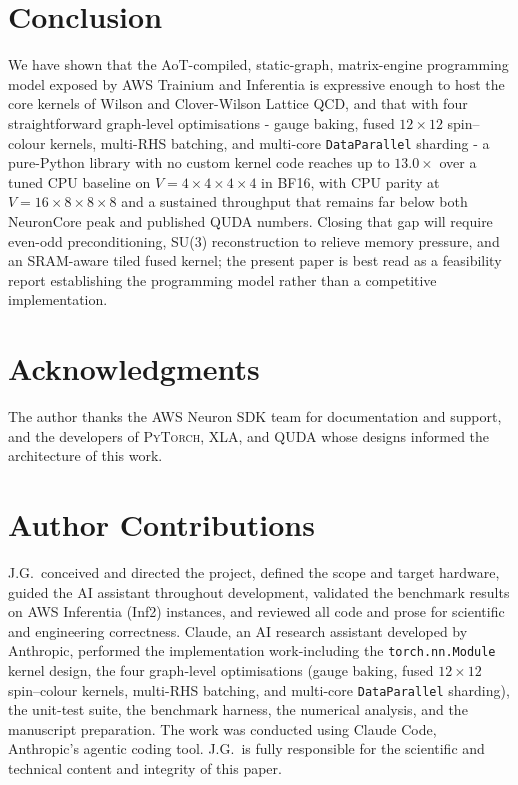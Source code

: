 \documentclass[a4paper,11pt]{article}
\newcommand{\PyT}{\textsc{PyTorch}}
\begin{document}
\section{Conclusion}
\label{sec:concl}

We have shown that the AoT-compiled, static-graph, matrix-engine
programming model exposed by AWS Trainium and Inferentia is
expressive enough to host the core kernels of Wilson and
Clover-Wilson Lattice QCD, and that with four straightforward
graph-level optimisations - gauge baking, fused $12{\times}12$
spin--colour kernels, multi-RHS batching, and multi-core
\texttt{DataParallel} sharding - a pure-Python library with no
custom kernel code reaches up to $13.0\times$ over a tuned CPU
baseline on $V=4{\times}4{\times}4{\times}4$ in BF16, with CPU parity
at $V=16{\times}8{\times}8{\times}8$ and a sustained throughput that
remains far below both NeuronCore peak and published QUDA numbers.
Closing that gap will require even-odd preconditioning, SU(3)
reconstruction to relieve memory pressure, and an SRAM-aware tiled
fused kernel; the present paper is best read as a feasibility report
establishing the programming model rather than a competitive
implementation.

\section*{Acknowledgments}
The author thanks the AWS Neuron SDK team for documentation and
support, and the developers of \PyT, XLA, and \textsc{QUDA} whose
designs informed the architecture of this work.

\section*{Author Contributions}

J.G.\ conceived and directed the project, defined the scope and target
hardware, guided the AI assistant throughout development, validated the
benchmark results on AWS Inferentia (Inf2) instances, and reviewed all
code and prose for scientific and engineering correctness. Claude, an AI
research assistant developed by Anthropic, performed the implementation
work-including the \texttt{torch.nn.Module} kernel design, the four
graph-level optimisations (gauge baking, fused $12{\times}12$
spin--colour kernels, multi-RHS batching, and multi-core
\texttt{DataParallel} sharding), the unit-test suite, the benchmark
harness, the numerical analysis, and the manuscript preparation. The
work was conducted using Claude Code, Anthropic's agentic coding tool.
J.G.\ is fully responsible for the scientific and technical content
and integrity of this paper.
\end{document}
